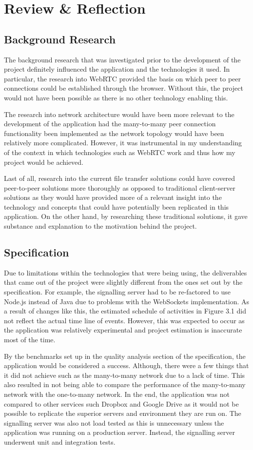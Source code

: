 \documentclass[]{report}
\begin{document}
	\chapter{Review \& Reflection}	
		\section{Background Research}
		The background research that was investigated prior to the development of the project definitely influenced the application and the technologies it used. In particular, the research into WebRTC provided the basis on which peer to peer connections could be established through the browser. Without this, the project would not have been possible as there is no other technology enabling this.
		
		The research into network architecture would have been more relevant to the development of the application had the many-to-many peer connection functionality been implemented as the network topology would have been relatively more complicated. However, it was instrumental in my understanding of the context in which technologies such as WebRTC work and thus how my project would be achieved.
		
		Last of all, research into the current file transfer solutions could have covered peer-to-peer solutions more thoroughly as opposed to traditional client-server solutions as they would have provided more of a relevant insight into the technology and concepts that could have potentially been replicated in this application. On the other hand, by researching these traditional solutions, it gave substance and explanation to the motivation behind the project.
		
		\section{Specification}
		Due to limitations within the technologies that were being using, the deliverables that came out of the project were slightly different from the ones set out by the specification. For example, the signalling server had to be re-factored to use Node.js instead of Java due to problems with the WebSockets implementation. As a result of changes like this, the estimated schedule of activities in Figure 3.1 did not reflect the actual time line of events. However, this was expected to occur as the application was relatively experimental and project estimation is inaccurate most of the time.
		
		By the benchmarks set up in the quality analysis section of the specification, the application would be considered a success. Although, there were a few things that it did not achieve such as the many-to-many network due to a lack of time. This also resulted in not being able to compare the performance of the many-to-many network with the one-to-many network. In the end, the application was not compared to other services such Dropbox and Google Drive as it would not be possible to replicate the superior servers and environment they are run on. The signalling server was also not load tested as this is unnecessary unless the application was running on a production server. Instead, the signalling server underwent unit and integration tests.
		
\end{document}
